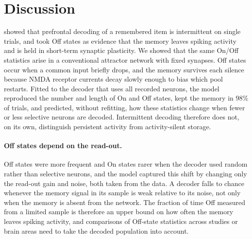 
\section{Discussion}

\citet{panichello2024} showed that prefrontal decoding of a remembered item is intermittent on single trials, and took Off states as evidence that the memory leaves spiking activity and is held in short-term synaptic plasticity.
We showed that the same On/Off statistics arise in a conventional attractor network with fixed synapses.
Off states occur when a common input briefly drops, and the memory survives each silence because NMDA receptor currents decay slowly enough to bias which pool restarts.
Fitted to the decoder that uses all recorded neurons, the model reproduced the number and length of On and Off states, kept the memory in 98\% of trials, and predicted, without refitting, how these statistics change when fewer or less selective neurons are decoded.
Intermittent decoding therefore does not, on its own, distinguish persistent activity from activity-silent storage.

\paragraph{Off states depend on the read-out.}
Off states were more frequent and On states rarer when the decoder used random rather than selective neurons, and the model captured this shift by changing only the read-out gain and noise, both taken from the data.
A decoder falls to chance whenever the memory signal in its sample is weak relative to its noise, not only when the memory is absent from the network.
The fraction of time Off measured from a limited sample is therefore an upper bound on how often the memory leaves spiking activity, and comparisons of Off-state statistics across studies or brain areas need to take the decoded population into account.

